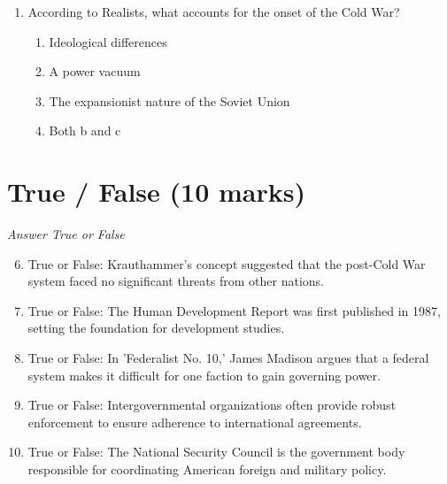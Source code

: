 \documentclass[12pt]{article}
\begin{document}
\begin{enumerate}[label=\arabic*.]
\begin{enumerate}[label=(\alph*)]
    \item Having the capability to deter the most powerful rival
    \item Having the capability to deter smaller states
    \item How nuclear attacks are identified and responded to; who controls the weapons
    \item Bureaucratic politics provides no information about nuclear proliferation and use
\end{enumerate}
\item According to Realists, what accounts for the onset of the Cold War?
\begin{enumerate}[label=(\alph*)]
    \item Ideological differences
    \item A power vacuum
    \item The expansionist nature of the Soviet Union
    \item Both b and c
\end{enumerate}
\end{enumerate}

\section*{True / False (10 marks)}
\textit{Answer True or False}
\begin{enumerate}[label=\arabic*.]
\setcounter{enumi}{5}
\item True or False: Krauthammer's concept suggested that the post-Cold War system faced no significant threats from other nations.
\item True or False: The Human Development Report was first published in 1987, setting the foundation for development studies.
\item True or False: In 'Federalist No. 10,' James Madison argues that a federal system makes it difficult for one faction to gain governing power.
\item True or False: Intergovernmental organizations often provide robust enforcement to ensure adherence to international agreements.
\item True or False: The National Security Council is the government body responsible for coordinating American foreign and military policy.
\end{enumerate}
\end{document}
